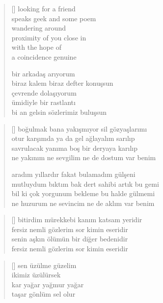 \documentclass[a5paper, openright, twoside]{memoir}
\begin{document}
\begin{verse}[\versewidth]
  looking for a friend \\
  speaks geek and some poem \\
  wandering around \\
  proximity of you close in \\
  with the hope of \\
  a coincidence genuine

  bir arkadaş arıyorum \\
  biraz kalem biraz defter konuşsun \\
  çevrende dolaşıyorum \\
  ümidiyle bir rastlantı \\
  bi an gelsin sözlerimiz buluşsun
\end{verse}
\begin{verse}[\versewidth]
  boğulmak bana yakışmıyor sil gözyaşlarımı \\
  otur karşımda ya da gel ağlayalım sarılıp \\
  savrulacak yanıma boş bir deryaya karılıp \\
  ne yakınım ne sevgilim ne de dostum var benim

  aradım yıllardır fakat bulamadım gülşeni \\
  mutluydum bıktım bak dert sahibi artık bu gemi \\
  bil ki çok yorgunum bekleme bu halde gülmemi \\
  ne huzurum ne sevincim ne de aklım var benim \\
\end{verse}
\begin{verse}[\versewidth]
  bitirdim mürekkebi kanım katsam yeridir \\
  fersiz nemli gözlerim sor kimin eseridir \\
  senin aşkın ölümün bir diğer bedenidir \\
  fersiz nemli gözlerim sor kimin eseridir
\end{verse}
\begin{verse}[\versewidth]
  sen üzülme güzelim \\
  ikimiz üzülürsek \\
  kar yağar yağmur yağar \\
  taşar gönlüm sel olur
\end{verse}
\end{document}
